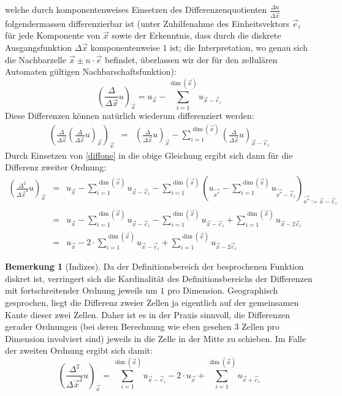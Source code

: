\documentclass[11pt]{article} %
\theoremstyle{definition}
\newtheorem*{bemerkung}{Bemerkung}
\begin{document}
welche durch komponentenweises Einsetzen des Differenzenquotienten $\frac {\Delta u}{\Delta \vec x}$ folgendermassen differenzierbar ist (unter Zuhilfenahme des Einheitsvektors $\vec e_i$ für jede Komponente von $\vec x$ sowie der Erkenntnis, dass durch die diskrete Ausgangsfunktion $\Delta \vec{x}$ komponentenweise $1$ ist; die Interpretation, wo genau sich die Nachbarzelle $\vec x \pm n\cdot\vec e$ befindet, überlassen wir der für den zellulären Automaten gültigen Nachbarschaftsfunktion):
\begin{equation}\label{diffone}
	\left(\frac {\Delta}{\Delta \vec x} u\right)_{\vec x} = u_{\vec x} - \sum\limits_{i=1}^{\dim(\vec x)} u_{\vec x - \vec e_i}
\end{equation}
Diese Differenzen können natürlich wiederum differenziert werden:
\begin{eqnarray*}
	\left(\frac{\Delta}{\Delta \vec x}\left( \frac {\Delta}{\Delta \vec x} u \right)_{\vec x}\right)_{\vec x} &=& \left(\frac {\Delta}{\Delta \vec x} u\right)_{\vec x} - \sum\limits_{i=1}^{\dim(\vec x)} \left( \frac {\Delta}{\Delta \vec x} u \right)_{\vec x - \vec e_i}
\end{eqnarray*}
Durch Einsetzen von \ref{diffone} in die obige Gleichung ergibt sich dann für die Differenz zweiter Ordnung:
\begin{eqnarray*}
\left( \frac{\Delta^2}{\Delta \vec x^2} u\right)_{\vec x} &=& u_{\vec x} - \sum\limits_{i=1}^{\dim(\vec x)} u_{\vec x - \vec e_i} - 
\sum\limits_{i=1}^{\dim(\vec x)} \left( u_{\vec {x^*}} - \sum\limits_{i=1}^{\dim(\vec x)} u_{\vec {x^*} - \vec e_i} \right)_{\vec {x^*} := \vec x - \vec e_i} \\
&=& u_{\vec x} - \sum\limits_{i=1}^{\dim(\vec x)} u_{\vec x - \vec e_i} - \sum\limits_{i=1}^{\dim(\vec x)} u_{\vec x - \vec e_i} + \sum\limits_{i=1}^{\dim(\vec x)} u_{\vec x - 2\vec e_i} \\
&=&  u_{\vec x} - 2\cdot\sum\limits_{i=1}^{\dim(\vec x)} u_{\vec x - \vec e_i} + \sum\limits_{i=1}^{\dim(\vec x)} u_{\vec x - 2\vec e_i}
\end{eqnarray*}

\begin{bemerkung}[Indizes]
Da der Definitionsbereich der besprochenen Funktion diskret ist, verringert sich die Kardinalität des Definitionsbereichs der Differenzen mit fortschreitender Ordnung jeweils um $1$ pro Dimension. Geographisch gesprochen, liegt die Differenz zweier Zellen ja eigentlich auf der gemeinsamen Kante dieser zwei Zellen. Daher ist es in der Praxis sinnvoll, die Differenzen gerader Ordnungen (bei deren Berechnung wie eben gesehen 3 Zellen pro Dimension involviert sind) jeweils in die Zelle in der Mitte zu schieben. Im Falle der zweiten Ordnung ergibt sich damit:
\begin{equation}
\left( \frac{\Delta^2}{\Delta \vec x^2} u\right)_{\vec x} =\sum\limits_{i=1}^{\dim(\vec x)} u_{\vec x - \vec e_i}  -2\cdot u_{\vec x} + \sum\limits_{i=1}^{\dim(\vec x)} u_{\vec x + \vec e_i}
\end{equation}
\end{bemerkung}
\end{document}
